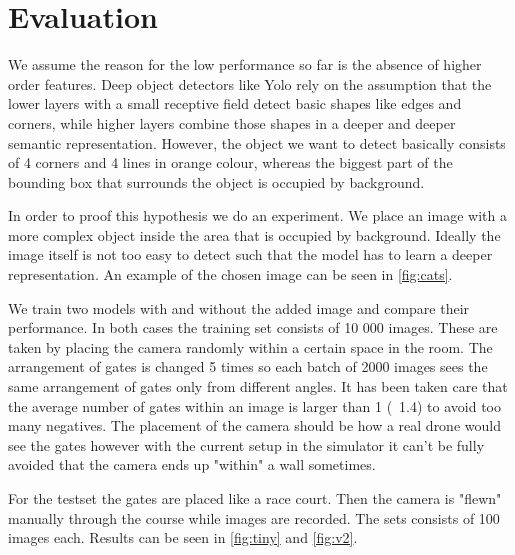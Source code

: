 \documentclass{article}
\begin{document}
\section{Evaluation}
We assume the reason for the low performance so far is the absence of higher order features. Deep object detectors like Yolo rely on the assumption that the lower layers with a small receptive field detect basic shapes like edges and corners, while higher layers combine those shapes in a deeper and deeper semantic representation. However, the object we want to detect basically consists of 4 corners and 4 lines in orange colour, whereas the biggest part of the bounding box that surrounds the object is occupied by background. 

In order to proof this hypothesis we do an experiment. We place an image with a more complex object inside the area that is occupied by background. Ideally the image itself is not too easy to detect such that the model has to learn a deeper representation. An example of the chosen image can be seen in \autoref{fig:cats}.

We train two models with and without the added image and compare their performance. In both cases the training set consists of 10 000 images. These are taken by placing the camera randomly within a certain space in the room. The arrangement of gates is changed 5 times so each batch of 2000 images sees the same arrangement of gates only from different angles. It has been taken care that the average number of gates within an image is larger than 1 (~1.4) to avoid too many negatives. The placement of the camera should be how a real drone would see the gates however with the current setup in the simulator it can't be fully avoided that the camera ends up "within" a wall sometimes.

For the testset the gates are placed like a race court. Then the camera is "flewn" manually through the course while images are recorded. The sets consists of 100 images each. Results can be seen in \autoref{fig:tiny} and \autoref{fig:v2}.
\end{document}
